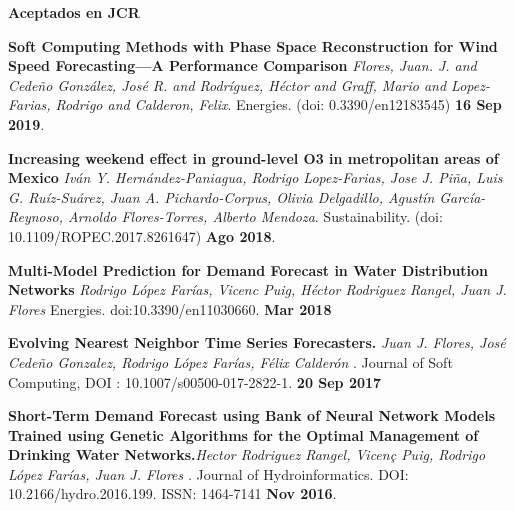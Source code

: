 \documentclass[10pt]{article}
\newenvironment{innerlist}[1][\enskip\textbullet]%
        {\begin{compactitem}[#1]}{\end{compactitem}}
\begin{document}
\textbf{Aceptados en JCR}

\begin{innerlist}

\item \textbf{Soft Computing Methods with Phase Space Reconstruction for Wind Speed Forecasting—A Performance Comparison} \textit{{Flores, Juan. J. and Cedeño González, José R. and Rodríguez, Héctor and Graff, Mario and Lopez-Farias, Rodrigo and Calderon, Felix}}. {Energies}. (doi: 0.3390/en12183545) \textbf{16 Sep 2019}.

\item \textbf{Increasing weekend effect in ground-level O3 in metropolitan areas of Mexico} \textit{Iván Y. Hernández-Paniagua, Rodrigo Lopez-Farias, Jose J. Piña, Luis G. Ruíz-Suárez, Juan A. Pichardo-Corpus, Olivia Delgadillo, Agustín García-Reynoso, Arnoldo Flores-Torres, Alberto Mendoza}. {Sustainability}. (doi: 10.1109/ROPEC.2017.8261647) \textbf{Ago 2018}.

\item \textbf{Multi-Model Prediction for Demand Forecast in
Water Distribution Networks} \textit{Rodrigo López Farías, Vicenc Puig, Héctor Rodriguez Rangel, Juan J. Flores} {Energies}. doi:10.3390/en11030660. \textbf{Mar 2018}

\item  \textbf{Evolving Nearest Neighbor Time Series Forecasters.} \textit{Juan J. Flores, José Cede\~no Gonzalez, Rodrigo López Farías, Félix Calderón }.  {Journal of Soft Computing},
DOI : 10.1007/s00500-017-2822-1. \textbf{20 Sep 2017}

\item \textbf{Short-Term Demand Forecast using Bank of Neural Network Models Trained using Genetic Algorithms for the Optimal Management of Drinking Water Networks.}\textit{Hector Rodriguez Rangel, Vicen\c{c} Puig, Rodrigo López Farías, Juan J. Flores }.  {Journal of Hydroinformatics}. DOI: 10.2166/hydro.2016.199. ISSN: 1464-7141 \textbf{Nov 2016}.





\end{innerlist}
\end{document}
